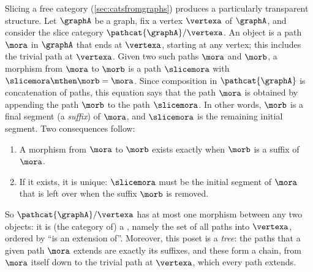 \begin{example}
    \label{exa:slice-free-routes}
    Slicing a free category (\cref{sec:catsfromgraphs}) produces a particularly transparent structure.
    Let $\graphA$ be a graph, fix a vertex $\vertexa$ of $\graphA$, and consider the slice category $\pathcat{\graphA} / \vertexa$.
    An object is a path $\mora$ in $\graphA$ that ends at $\vertexa$, starting at any vertex; this includes the trivial path at $\vertexa$.
    Given two such paths $\mora$ and $\morb$, a morphism from $\mora$ to $\morb$ is a path $\slicemora$ with $\slicemora \mthen \morb = \mora$.
    Since composition in $\pathcat{\graphA}$ is concatenation of paths, this equation says that the path $\mora$ is obtained by appending the path $\morb$ to the path $\slicemora$.
    In other words, $\morb$ is a final segment (a \emph{suffix}) of $\mora$, and $\slicemora$ is the remaining initial segment.
    Two consequences follow:
    \begin{enumerate}
        \item A morphism from $\mora$ to $\morb$ exists exactly when $\morb$ is a suffix of $\mora$.
        \item If it exists, it is unique: $\slicemora$ must be the initial segment of $\mora$ that is left over when the suffix $\morb$ is removed.
    \end{enumerate}
    So $\pathcat{\graphA} / \vertexa$ has at most one morphism between any two objects: it is (the category of) a , namely the set of all paths into $\vertexa$, ordered by ``is an extension of''.
    Moreover, this poset is a \emph{tree}: the paths that a given path $\mora$ extends are exactly its suffixes, and these form a chain, from $\mora$ itself down to the trivial path at $\vertexa$, which every path extends.


\end{example}
